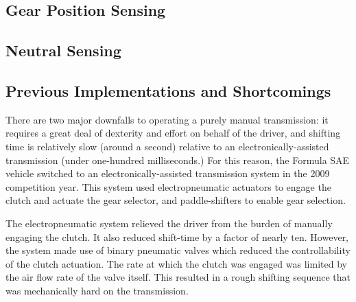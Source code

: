 \subsection{Gear Position Sensing}

\subsection{Neutral Sensing}

\subsection{Previous Implementations and Shortcomings}

There are two major downfalls to operating a purely manual transmission: it requires a great deal of dexterity and effort on behalf of the driver, and shifting time is relatively slow (around a second) relative to an electronically-assisted transmission (under one-hundred milliseconds.) For this reason, the Formula SAE vehicle switched to an electronically-assisted transmission system in the 2009 competition year. This system used electropneumatic actuators to engage the clutch and actuate the gear selector, and paddle-shifters to enable gear selection.

The electropneumatic system relieved the driver from the burden of manually engaging the clutch. It also reduced shift-time by a factor of nearly ten. However, the system made use of binary pneumatic valves which reduced the controllability of the clutch actuation. The rate at which the clutch was engaged was limited by the air flow rate of the valve itself. This resulted in a rough shifting sequence that was mechanically hard on the transmission. 
